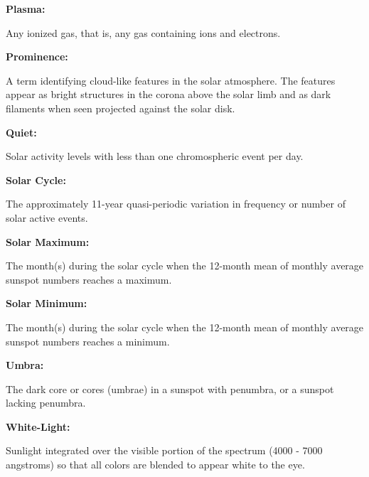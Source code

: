\textbf{Plasma:}
\begin{myindentpar}{1cm}
  Any ionized gas, that is, any gas containing ions and electrons.
\end{myindentpar}

\textbf{Prominence:}
\begin{myindentpar}{1cm}
  A term identifying cloud-like features in the solar atmosphere. The features appear as bright structures in the corona above the solar limb and as dark filaments when seen projected against the solar disk.
\end{myindentpar}

\textbf{Quiet:}
\begin{myindentpar}{1cm}
  Solar activity levels with less than one chromospheric event per day.
\end{myindentpar}

\textbf{Solar Cycle:}
\begin{myindentpar}{1cm}
  The approximately 11-year quasi-periodic variation in frequency or number of solar active events.
\end{myindentpar}

\textbf{Solar Maximum:}
\begin{myindentpar}{1cm}
  The month(s) during the solar cycle when the 12-month mean of monthly average sunspot numbers reaches a maximum.
\end{myindentpar}

\textbf{Solar Minimum:}
\begin{myindentpar}{1cm}
  The month(s) during the solar cycle when the 12-month mean of monthly average sunspot numbers reaches a minimum.
\end{myindentpar}

\textbf{Umbra:}
\begin{myindentpar}{1cm}
  The dark core or cores (umbrae) in a sunspot with penumbra, or a sunspot lacking penumbra.
\end{myindentpar}

\textbf{White-Light:}
\begin{myindentpar}{1cm}
  Sunlight integrated over the visible portion of the spectrum (4000 - 7000 angstroms) so that all colors are blended to appear white to the eye.
\end{myindentpar}
